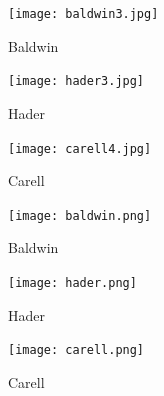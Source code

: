 \documentclass{article}
\begin{document}
\begin{figure}[!ht]
\begin{subfigure}{.35\textwidth}
  \texttt{[image: baldwin3.jpg]}
  \caption{Baldwin}
  \label{fig:sfig7}
\end{subfigure}
\begin{subfigure}{.35\textwidth}
  \texttt{[image: hader3.jpg]}
  \caption{Hader}
  \label{fig:sfig8}
\end{subfigure}%
\begin{subfigure}{.35\textwidth}
  \texttt{[image: carell4.jpg]}
  \caption{Carell}
  \label{fig:sfig9}
\end{subfigure}
\begin{subfigure}{.35\textwidth}
  \texttt{[image: baldwin.png]}
  \caption{Baldwin}
  \label{fig:sfig10}
\end{subfigure}%
\begin{subfigure}{.35\textwidth}
  \texttt{[image: hader.png]}
  \caption{Hader}
  \label{fig:sfig11}
\end{subfigure}
\begin{subfigure}{.35\textwidth}
  \texttt{[image: carell.png]}
  \caption{Carell}
  \label{fig:sfig12}%
\end{subfigure}
\caption{}
\label{fig:pcs1}
\end{figure}
\clearpage
\end{document}
